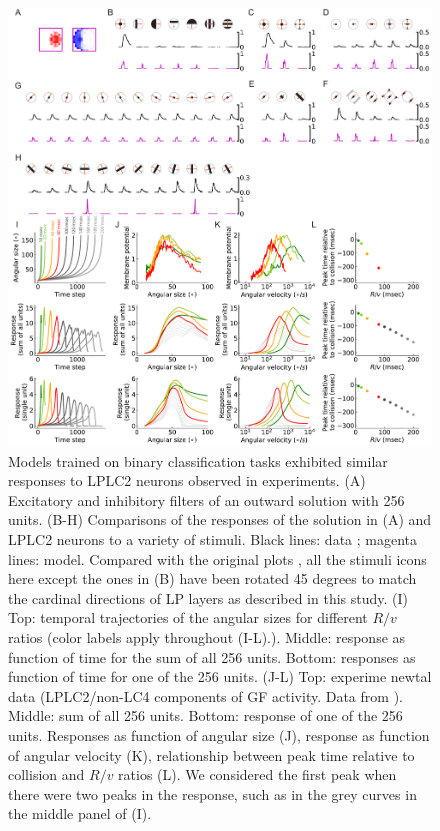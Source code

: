 \documentclass[pdftex,9pt,lineno]{elife}
\begin{document}
\begin{figure}
\begin{fullwidth}
\includegraphics[width=\linewidth]{figures/replication_paper.pdf}
\caption{Models trained on binary classification tasks exhibited similar responses to LPLC2 neurons observed in experiments. (A) Excitatory and inhibitory filters of an outward solution with 256 units. (B-H) Comparisons of the responses of the solution in (A) and LPLC2 neurons to a variety of stimuli. Black lines: data \citep{klapoetke2017ultra}; magenta lines: model. Compared with the original plots \citep{klapoetke2017ultra}, all the stimuli icons here except the ones in (B) have been rotated 45 degrees to match the cardinal directions of LP layers as described in this study. (I) Top: temporal trajectories of the angular sizes for different $R/v$ ratios (color labels apply throughout (I-L).). Middle: response as function of time for the sum of all 256 units. Bottom: responses as function of time for one of the 256 units. (J-L) Top: experime
newtal data (LPLC2/non-LC4 components of GF activity. Data from \citep{von2017feature,ache2019neural}). Middle: sum of all 256 units. Bottom: response of one of the 256 units. Responses as function of angular size (J), response as function of angular velocity (K), relationship between peak time relative to collision and $R/v$ ratios (L). We considered the first peak when there were two peaks in the response, such as in the grey curves in the middle panel of (I).}

\end{fullwidth}
\end{figure}
\end{document}
